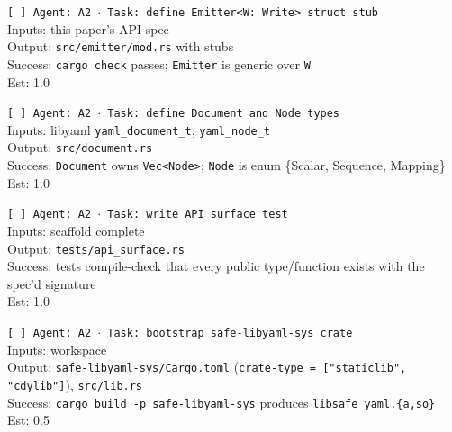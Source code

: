 \documentclass[12pt]{article}
\theoremstyle{definition}
\theoremstyle{remark}
\begin{document}
\begin{small}
\noindent\texttt{[ ] Agent: A2 $\cdot$ Task: define Emitter<W: Write> struct stub}\\
\hspace*{2em}Inputs: this paper's API spec\\
\hspace*{2em}Output: \texttt{src/emitter/mod.rs} with stubs\\
\hspace*{2em}Success: \texttt{cargo check} passes; \texttt{Emitter} is generic over \texttt{W}\\
\hspace*{2em}Est: 1.0

\noindent\texttt{[ ] Agent: A2 $\cdot$ Task: define Document and Node types}\\
\hspace*{2em}Inputs: libyaml \texttt{yaml\_document\_t}, \texttt{yaml\_node\_t}\\
\hspace*{2em}Output: \texttt{src/document.rs}\\
\hspace*{2em}Success: \texttt{Document} owns \texttt{Vec<Node>}; \texttt{Node} is enum \{Scalar, Sequence, Mapping\}\\
\hspace*{2em}Est: 1.0

\noindent\texttt{[ ] Agent: A2 $\cdot$ Task: write API surface test}\\
\hspace*{2em}Inputs: scaffold complete\\
\hspace*{2em}Output: \texttt{tests/api\_surface.rs}\\
\hspace*{2em}Success: tests compile-check that every public type/function exists with the spec'd signature\\
\hspace*{2em}Est: 1.0

\noindent\texttt{[ ] Agent: A2 $\cdot$ Task: bootstrap safe-libyaml-sys crate}\\
\hspace*{2em}Inputs: workspace\\
\hspace*{2em}Output: \texttt{safe-libyaml-sys/Cargo.toml} (\texttt{crate-type = ["staticlib", "cdylib"]}), \texttt{src/lib.rs}\\
\hspace*{2em}Success: \texttt{cargo build -p safe-libyaml-sys} produces \texttt{libsafe\_yaml.\{a,so\}}\\
\hspace*{2em}Est: 0.5


\end{small}
\end{document}

